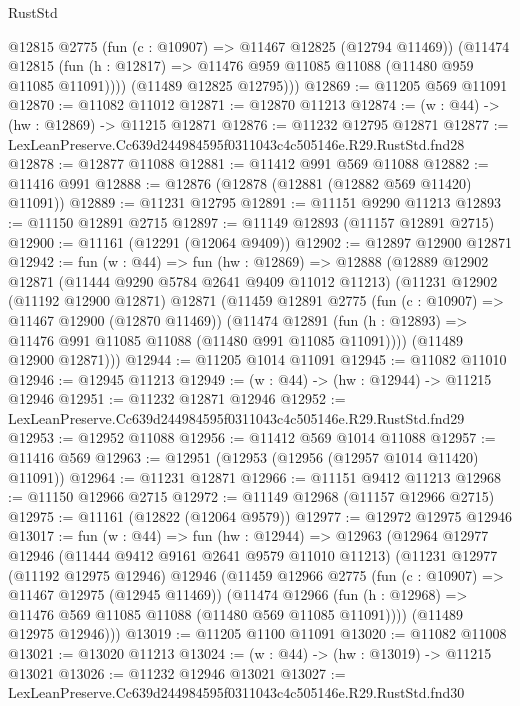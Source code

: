 \begin{lexlean}{RustStd}
\begin{coremodule}
          @12815
          @2775
          (fun (c : @10907) => @11467 @12825 (@12794 @11469))
          (@11474
            @12815
            (fun (h : @12817) => @11476 @959 @11085 @11088 (@11480 @959 @11085 @11091))))
        (@11489 @12825 @12795)))
@12869 := @11205 @569 @11091
@12870 := @11082 @11012
@12871 := @12870 @11213
@12874 := (w : @44) -> (hw : @12869) -> @11215 @12871
@12876 := @11232 @12795 @12871
@12877 := LexLeanPreserve.Cc639d244984595f0311043c4c505146e.R29.RustStd.fnd28
@12878 := @12877 @11088
@12881 := @11412 @991 @569 @11088
@12882 := @11416 @991
@12888 := @12876 (@12878 (@12881 (@12882 @569 @11420) @11091))
@12889 := @11231 @12795
@12891 := @11151 @9290 @11213
@12893 := @11150 @12891 @2715
@12897 := @11149 @12893 (@11157 @12891 @2715)
@12900 := @11161 (@12291 (@12064 @9409))
@12902 := @12897 @12900 @12871
@12942 := fun (w : @44) =>
  fun (hw : @12869) =>
  @12888
    (@12889
      @12902
      @12871
      (@11444 @9290 @5784 @2641 @9409 @11012 @11213)
      (@11231
        @12902
        (@11192 @12900 @12871)
        @12871
        (@11459
          @12891
          @2775
          (fun (c : @10907) => @11467 @12900 (@12870 @11469))
          (@11474
            @12891
            (fun (h : @12893) => @11476 @991 @11085 @11088 (@11480 @991 @11085 @11091))))
        (@11489 @12900 @12871)))
@12944 := @11205 @1014 @11091
@12945 := @11082 @11010
@12946 := @12945 @11213
@12949 := (w : @44) -> (hw : @12944) -> @11215 @12946
@12951 := @11232 @12871 @12946
@12952 := LexLeanPreserve.Cc639d244984595f0311043c4c505146e.R29.RustStd.fnd29
@12953 := @12952 @11088
@12956 := @11412 @569 @1014 @11088
@12957 := @11416 @569
@12963 := @12951 (@12953 (@12956 (@12957 @1014 @11420) @11091))
@12964 := @11231 @12871
@12966 := @11151 @9412 @11213
@12968 := @11150 @12966 @2715
@12972 := @11149 @12968 (@11157 @12966 @2715)
@12975 := @11161 (@12822 (@12064 @9579))
@12977 := @12972 @12975 @12946
@13017 := fun (w : @44) =>
  fun (hw : @12944) =>
  @12963
    (@12964
      @12977
      @12946
      (@11444 @9412 @9161 @2641 @9579 @11010 @11213)
      (@11231
        @12977
        (@11192 @12975 @12946)
        @12946
        (@11459
          @12966
          @2775
          (fun (c : @10907) => @11467 @12975 (@12945 @11469))
          (@11474
            @12966
            (fun (h : @12968) => @11476 @569 @11085 @11088 (@11480 @569 @11085 @11091))))
        (@11489 @12975 @12946)))
@13019 := @11205 @1100 @11091
@13020 := @11082 @11008
@13021 := @13020 @11213
@13024 := (w : @44) -> (hw : @13019) -> @11215 @13021
@13026 := @11232 @12946 @13021
@13027 := LexLeanPreserve.Cc639d244984595f0311043c4c505146e.R29.RustStd.fnd30

\end{coremodule}
\end{lexlean}
